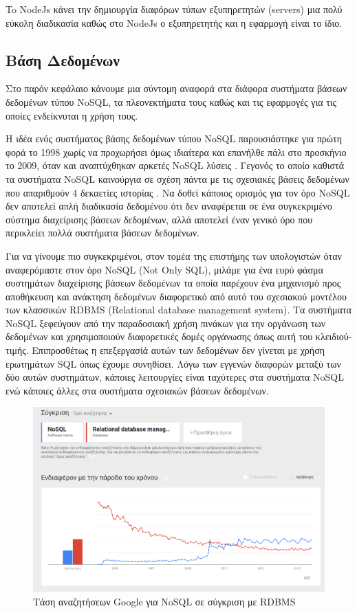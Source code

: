 		To NodeJs κάνει την δημιουργία διαφόρων τύπων εξυπηρετητών (servers) μια πολύ εύκολη διαδικασία καθώς στο NodeJs ο εξυπηρετητής και η εφαρμογή είναι το ίδιο.

		
	\subsection{Βάση Δεδομένων}
	Στο παρόν κεφάλαιο κάνουμε μια σύντομη αναφορά στα διάφορα συστήματα βάσεων δεδομένων τύπου NoSQL, τα πλεονεκτήματα τους καθώς και τις εφαρμογές για τις οποίες ενδείκνυται η χρήση τους.
	
	Η ιδέα ενός συστήματος βάσης δεδομένων τύπου NoSQL παρουσιάστηκε για πρώτη φορά το 1998 χωρίς να προχωρήσει όμως ιδιαίτερα και επανήλθε πάλι στο προσκήνιο το 2009, όταν και αναπτύχθηκαν αρκετές NoSQL λύσεις \cite{5993686}. Γεγονός το οποίο καθιστά τα συστήματα NoSQL καινούργια σε σχέση πάντα με τις σχεσιακές βάσεις δεδομένων που απαριθμούν 4 δεκαετίες ιστορίας \cite{Codd:1970:RMD:362384.362685}. Να δοθεί κάποιος ορισμός για τον όρο NoSQL δεν αποτελεί απλή διαδικασία δεδομένου ότι δεν αναφέρεται σε ένα συγκεκριμένο σύστημα διαχείρισης βάσεων δεδομένων, αλλά αποτελεί έναν γενικό όρο που περικλείει πολλά συστήματα βάσεων δεδομένων.
	
	Για να γίνουμε πιο συγκεκριμένοι, στον τομέα της επιστήμης των υπολογιστών όταν αναφερόμαστε στον όρο NoSQL (Not Only SQL), μιλάμε για ένα ευρύ φάσμα συστημάτων διαχείρισης βάσεων δεδομένων τα οποία παρέχουν ένα μηχανισμό προς αποθήκευση και ανάκτηση δεδομένων διαφορετικό από αυτό του σχεσιακού μοντέλου των κλασσικών RDBMS (Relational database management system)\cite{Cattell:2011:SSN:1978915.1978919}\cite{6106531}. Τα συστήματα NoSQL ξεφεύγουν από την παραδοσιακή χρήση πινάκων για την οργάνωση των δεδομένων και χρησιμοποιούν διαφορετικές δομές οργάνωσης όπως αυτή του κλειδιού-τιμής. Επιπροσθέτως η επεξεργασίά αυτών των δεδομένων δεν γίνεται με χρήση ερωτημάτων SQL όπως έχουμε συνηθίσει. Λόγω των εγγενών διαφορών μεταξύ των δύο αυτών συστημάτων, κάποιες λειτουργίες είναι ταχύτερες στα συστήματα NoSQL ενώ κάποιες άλλες στα συστήματα σχεσιακών βάσεων δεδομένων.
	
	\begin{figure}[h]
	    \centering
	    \includegraphics[width=1\textwidth]{nosql_vs_rdbms.png}
	    \caption{Τάση αναζητήσεων Google για NoSQL σε σύγκριση με RDBMS}
	    \label{fig:NoSQL_vs_rdbms_google}
	\end{figure}
	
